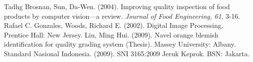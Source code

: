 \documentclass[laporan.tex]{subfiles}
\begin{document}
\begin{thebibliography}{99}
 Tadhg Brosnan, Sun, Da-Wen. (2004). Improving quality inspection of food products by computer vision––a review. \emph{Journal of Food Engineering, 61}, 3-16.
 Rafael C. Gonzales, Woods, Richard E. (2002). Digital Image Processing. Prentice Hall: New Jersey.
 Liu, Ming Hui. (2009). Navel orange blemish identification for quality grading system (Thesis). Massey University: Albany.
 Standard Nasional Indonesia. (2009). SNI 3165:2009 Jeruk Keprok. BSN: Jakarta.
\end{thebibliography}
\end{document}

